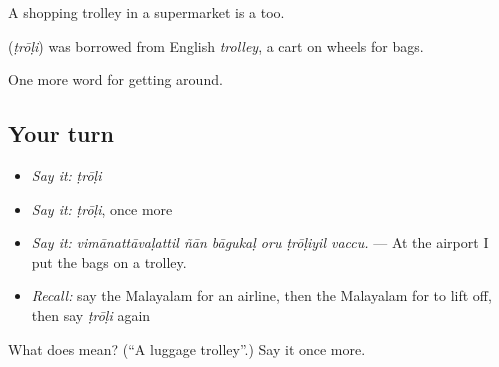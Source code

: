 A shopping trolley in a supermarket is a  too.

\begin{cousinweb}
\textbf{} (\emph{ṭrōḷi}) was borrowed from English \emph{trolley}, a cart on wheels for bags.
\end{cousinweb}

\begin{grammarlens}[title={What you've built}]
One more word for getting around.
\end{grammarlens}

\subsection*{Your turn}
\begin{itemize}
\raggedright
  \item \emph{Say it:} \emph{ṭrōḷi}
  \item \emph{Say it:} \emph{ṭrōḷi}, once more
  \item \emph{Say it:} \emph{vimānattāvaḷattil ñān bāgukaḷ oru ṭrōḷiyil vaccu.} — At the airport I put the bags on a trolley.
  \item \emph{Recall:} say the Malayalam for an airline, then the Malayalam for to lift off, then say \emph{ṭrōḷi} again
\end{itemize}

\begin{tcolorbox}[breakable,colback=teal!4,colframe=teal!35!black,title={Before you move on}]
What does  mean? (\textquotedblleft{}A luggage trolley\textquotedblright{}.) Say it once more.
\end{tcolorbox}
